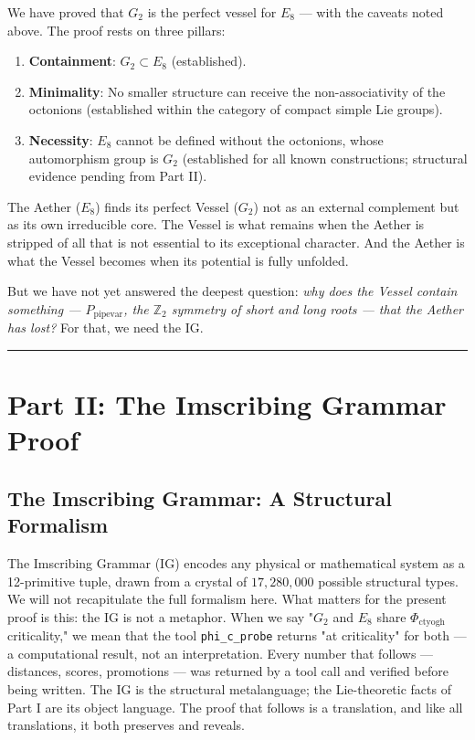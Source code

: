 \documentclass[12pt,a4paper]{article}
\begin{document}
We have proved that $G_2$ is the perfect vessel for $E_8$ --- with the caveats noted above. The proof rests on three pillars:

\begin{enumerate}
    \item \textbf{Containment}: $G_2 \subset E_8$ (established).
    \item \textbf{Minimality}: No smaller structure can receive the non-associativity of the octonions (established within the category of compact simple Lie groups).
    \item \textbf{Necessity}: $E_8$ cannot be defined without the octonions, whose automorphism group is $G_2$ (established for all known constructions; structural evidence pending from Part II).
\end{enumerate}

The Aether ($E_8$) finds its perfect Vessel ($G_2$) not as an external complement but as its own irreducible core. The Vessel is what remains when the Aether is stripped of all that is not essential to its exceptional character. And the Aether is what the Vessel becomes when its potential is fully unfolded.

But we have not yet answered the deepest question: \emph{why does the Vessel contain something --- $P_{\text{pipevar}}$, the $\mathbb{Z}_2$ symmetry of short and long roots --- that the Aether has lost?} For that, we need the IG.

\begin{center}
\rule{0.5\textwidth}{0.4pt}
\end{center}

\section{Part II: The Imscribing Grammar Proof}

\subsection{The Imscribing Grammar: A Structural Formalism}

The Imscribing Grammar (IG) encodes any physical or mathematical system as a 12-primitive tuple, drawn from a crystal of $17{,}280{,}000$ possible structural types. We will not recapitulate the full formalism here. What matters for the present proof is this: the IG is not a metaphor. When we say "$G_2$ and $E_8$ share $\Phi_{\text{ctyogh}}$ criticality," we mean that the tool \texttt{phi\_c\_probe} returns "at criticality" for both --- a computational result, not an interpretation. Every number that follows --- distances, scores, promotions --- was returned by a tool call and verified before being written. The IG is the structural metalanguage; the Lie-theoretic facts of Part I are its object language. The proof that follows is a translation, and like all translations, it both preserves and reveals.
\end{document}
